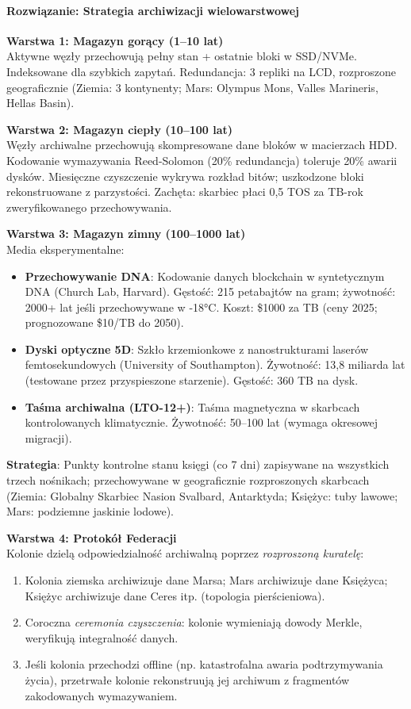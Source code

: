 \documentclass[11pt]{article}
\begin{document}
\paragraph{Rozwiązanie: Strategia archiwizacji wielowarstwowej}

\textbf{Warstwa 1: Magazyn gorący (1--10 lat)}\\
Aktywne węzły przechowują pełny stan + ostatnie bloki w SSD/NVMe. Indeksowane dla szybkich zapytań. Redundancja: 3 repliki na LCD, rozproszone geograficznie (Ziemia: 3 kontynenty; Mars: Olympus Mons, Valles Marineris, Hellas Basin).

\textbf{Warstwa 2: Magazyn ciepły (10--100 lat)}\\
Węzły archiwalne przechowują skompresowane dane bloków w macierzach HDD. Kodowanie wymazywania Reed-Solomon (20\% redundancja) toleruje 20\% awarii dysków. Miesięczne czyszczenie wykrywa rozkład bitów; uszkodzone bloki rekonstruowane z parzystości. Zachęta: skarbiec płaci 0,5 TOS za TB-rok zweryfikowanego przechowywania.

\textbf{Warstwa 3: Magazyn zimny (100--1000 lat)}\\
Media eksperymentalne:
\begin{itemize}[noitemsep]
  \item \textbf{Przechowywanie DNA}: Kodowanie danych blockchain w syntetycznym DNA (Church Lab, Harvard). Gęstość: 215 petabajtów na gram; żywotność: 2000+ lat jeśli przechowywane w -18°C. Koszt: \$1000 za TB (ceny 2025; prognozowane \$10/TB do 2050).
  \item \textbf{Dyski optyczne 5D}: Szkło krzemionkowe z nanostrukturami laserów femtosekundowych (University of Southampton). Żywotność: 13,8 miliarda lat (testowane przez przyspieszone starzenie). Gęstość: 360 TB na dysk.
  \item \textbf{Taśma archiwalna (LTO-12+)}: Taśma magnetyczna w skarbcach kontrolowanych klimatycznie. Żywotność: 50--100 lat (wymaga okresowej migracji).
\end{itemize}
\textbf{Strategia}: Punkty kontrolne stanu księgi (co 7 dni) zapisywane na wszystkich trzech nośnikach; przechowywane w geograficznie rozproszonych skarbcach (Ziemia: Globalny Skarbiec Nasion Svalbard, Antarktyda; Księżyc: tuby lawowe; Mars: podziemne jaskinie lodowe).

\textbf{Warstwa 4: Protokół Federacji}\\
Kolonie dzielą odpowiedzialność archiwalną poprzez \emph{rozproszoną kuratelę}:
\begin{enumerate}[noitemsep]
  \item Kolonia ziemska archiwizuje dane Marsa; Mars archiwizuje dane Księżyca; Księżyc archiwizuje dane Ceres itp. (topologia pierścieniowa).
  \item Coroczna \emph{ceremonia czyszczenia}: kolonie wymieniają dowody Merkle, weryfikują integralność danych.
  \item Jeśli kolonia przechodzi offline (np. katastrofalna awaria podtrzymywania życia), przetrwałe kolonie rekonstruują jej archiwum z fragmentów zakodowanych wymazywaniem.
\end{enumerate}
\end{document}
